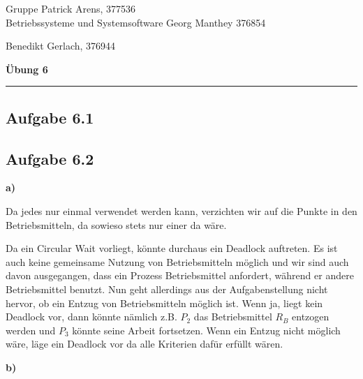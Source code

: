 \documentclass[a4paper,graphics,11pt]{article}
\newcommand{\aufgabe}[1]{\subsection*{Aufgabe #1}}
\begin{document}
\noindent Gruppe              \hfill Patrick Arens, 377536\\
\noindent Betriebssysteme und Systemsoftware    \hfill Georg Manthey 376854\\
\strut\hfill Benedikt Gerlach, 376944\\
\begin{center}
	\LARGE{\textbf{Übung 6}}
\end{center}
\begin{center}
\rule[0.1ex]{\textwidth}{1pt}
\end{center}
\aufgabe{6.1}

\aufgabe{6.2}

\textbf{a)}

Da jedes nur einmal verwendet werden kann, verzichten wir auf die Punkte in den Betriebsmitteln, da sowieso stets nur einer da wäre.


Da ein Circular Wait vorliegt, könnte durchaus ein Deadlock auftreten. Es ist auch keine gemeinsame Nutzung von Betriebsmitteln möglich und wir sind auch davon ausgegangen, dass ein Prozess Betriebsmittel anfordert, während er andere Betriebsmittel benutzt. Nun geht allerdings aus der Aufgabenstellung nicht hervor, ob ein Entzug von Betriebsmitteln möglich ist. Wenn ja, liegt kein Deadlock vor, dann könnte nämlich z.B. $P_2$ das Betriebsmittel $R_B$ entzogen werden und $P_3$ könnte seine Arbeit fortsetzen. Wenn ein Entzug nicht möglich wäre, läge ein Deadlock vor da alle Kriterien dafür erfüllt wären.

\textbf{b)}
\end{document}
